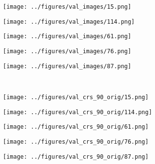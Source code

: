 \begin{figure}
	\begin{subfigure}{0.19\textwidth}
		\centering
		\texttt{[image: ../figures/val\_images/15.png]}
		\label{fig:1}
	\end{subfigure}
	\begin{subfigure}{0.19\textwidth}
		\centering
		\texttt{[image: ../figures/val\_images/114.png]}
		\label{fig:1}
	\end{subfigure}
	\begin{subfigure}{0.19\textwidth}
		\centering
		\texttt{[image: ../figures/val\_images/61.png]}
		\label{fig:1}
	\end{subfigure}
	\begin{subfigure}{0.19\textwidth}
		\centering
		\texttt{[image: ../figures/val\_images/76.png]}
		\label{fig:1}
	\end{subfigure}
	\begin{subfigure}{0.19\textwidth}
		\centering
		\texttt{[image: ../figures/val\_images/87.png]}
		\label{fig:1}
	\end{subfigure}
		\vspace{-0.4cm}
	\\
		\begin{subfigure}{0.19\textwidth}
		\centering
		\texttt{[image: ../figures/val\_crs\_90\_orig/15.png]}
		\label{fig:1}
	\end{subfigure}
	\begin{subfigure}{0.19\textwidth}
		\centering
		\texttt{[image: ../figures/val\_crs\_90\_orig/114.png]}
		\label{fig:1}
	\end{subfigure}
	\begin{subfigure}{0.19\textwidth}
		\centering
		\texttt{[image: ../figures/val\_crs\_90\_orig/61.png]}
		\label{fig:1}
	\end{subfigure}
	\begin{subfigure}{0.19\textwidth}
		\centering
		\texttt{[image: ../figures/val\_crs\_90\_orig/76.png]}
		\label{fig:1}
	\end{subfigure}
	\begin{subfigure}{0.19\textwidth}
		\centering
		\texttt{[image: ../figures/val\_crs\_90\_orig/87.png]}
		\label{fig:1}
	\end{subfigure}
	\vspace{-0.4cm}
	\\
	\begin{subfigure}{0.19\textwidth}

\end{subfigure}
\end{figure}
